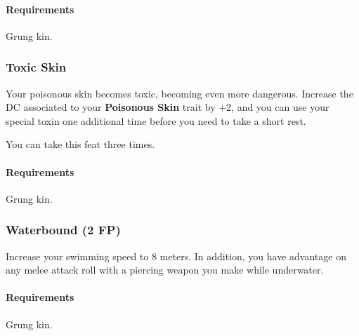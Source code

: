         \paragraph{Requirements} Grung kin.
    \subsubsection{Toxic Skin} \label{feat::toxicskin}
        Your poisonous skin becomes toxic, becoming even more dangerous.
        Increase the DC associated to your \textbf{Poisonous Skin} trait by +2, and you can use your special toxin one additional time before you need to take a short rest.

        You can take this feat three times.
        \paragraph{Requirements} Grung kin.
    \subsubsection{Waterbound (2 FP)} \label{feat::waterbound}
        Increase your swimming speed to 8 meters.
        In addition, you have advantage on any melee attack roll with a piercing weapon you make while underwater.
        \paragraph{Requirements} Grung kin.

\newpage
